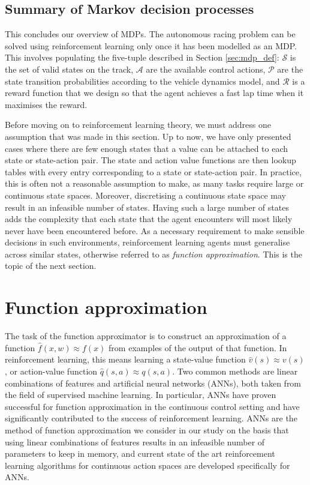 \subsection{Summary of Markov decision processes}
This concludes our overview of MDPs.
The autonomous racing problem can be solved using reinforcement learning only once it has been modelled as an MDP. This involves populating the five-tuple described in Section \ref{sec:mdp_def}: $\mathcal{S}$ is the set of valid states on the track, $\mathcal{A}$ are the available control actions, $\mathcal{P}$ are the state transition probabilities according to the vehicle dynamics model, and $\mathcal{R}$ is a reward function that we design so that the agent achieves a fast lap time when it maximises the reward. 

Before moving on to reinforcement learning theory, we must address one assumption that was made in this section.
Up to now, we have only presented cases where there are few enough states that a value can be attached to each state or state-action pair.
The state and action value functions are then lookup tables with every entry corresponding to a state or state-action pair.
In practice, this is often not a reasonable assumption to make, as many tasks require large or continuous state spaces.
Moreover, discretising a continuous state space may result in an infeasible number of states.
Having such a large number of states adds the complexity that each state that the agent encounters will most likely never have been encountered before.
As a necessary requirement to make sensible decisions in such environments, reinforcement learning agents must generalise across similar states, otherwise referred to as \emph{function approximation}.
This is the topic of the next section.


\section{Function approximation}
\label{sec:function_approximation}
The task of the function approximator is to construct an approximation of a function $\hat{f}(x,w) \approx f(x)$
from examples of the output of that function. 
In reinforcement learning, this means learning a state-value function $\hat{v}(s) \approx v(s)$, or action-value function $\hat{q}(s,a) \approx q(s,a)$.
Two common methods are linear combinations of features and artificial neural networks (ANNs), both taken from the field of supervised machine learning.
In particular, ANNs have proven successful for function approximation in the continuous control setting and have significantly contributed to the success of reinforcement learning. 
ANNs are the method of function approximation we consider in our study on the basis that using linear combinations of features results in an infeasible number of parameters to keep in memory, and current state of the art reinforcement learning algorithms for continuous action spaces are developed specifically for ANNs.


